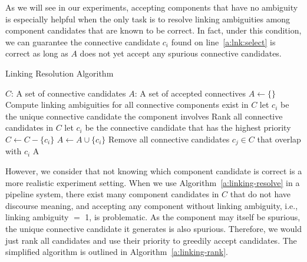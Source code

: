 As we will see in our experiments, accepting components that have no ambiguity
is especially helpful when the only task is to resolve linking ambiguities among
component candidates that are known to be correct.
In fact, under this condition, we can guarantee the connective candidate
$c_i$ found on line~\ref{a:lnk:select} is correct as long as $A$ does not yet accept
any spurious connective candidates.

\begin{algorithm}
    \caption{Linking Resolution Algorithm}
    \label{a:linking-resolve}
    \begin{algorithmic}[1]
        \Require
            $C$: A set of connective candidates
        \Ensure
            $A$: A set of accepted connectives
        \State $A \gets \{\}$
            \State Compute linking ambiguities for all connective components exist in $C$ \label{a:lnk:compute}
             \label{a:lnk:check}
                \State let $ c_i $ be the unique connective candidate the component involves \label{a:lnk:select}
            \Else
                \State Rank all connective candidates in $ C $
                \State let $ c_i $ be the connective candidate that has the highest priority
            \EndIf
                \State $C \gets C - \{c_i\}$
                \State $A \gets A \cup \{c_i\}$
            \State Remove all connective candidates $ c_j \in C $ that overlap with $ c_i $
        \EndWhile
        \State \Return A
    \end{algorithmic}
\end{algorithm}

However, we consider that not knowing
which component candidate is correct is a more realistic experiment setting.
When we use Algorithm~\ref{a:linking-resolve} in a pipeline system,
there exist many component candidates in $C$ that do not have discourse meaning,
and accepting any component without linking ambiguity, i.e., linking ambiguity $=$ 1,
is problematic. As the component may itself be spurious, the unique connective
candidate it generates is also spurious.
Therefore, we would just rank all
candidates and use their priority to greedily accept candidates. The simplified
algorithm is outlined in Algorithm~\ref{a:linking-rank}.

